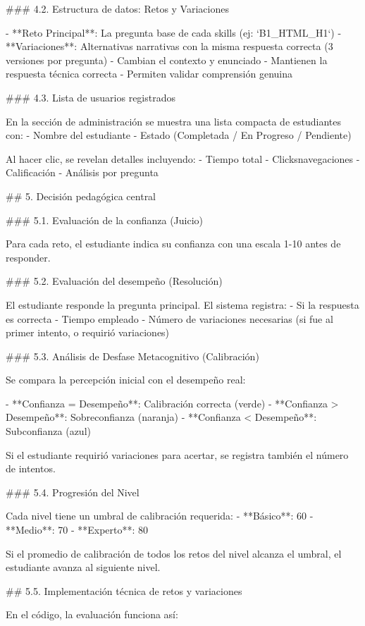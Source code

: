 ### 4.2. Estructura de datos: Retos y Variaciones

- **Reto Principal**: La pregunta base de cada skills (ej: `B1_HTML_H1`)
- **Variaciones**: Alternativas narrativas con la misma respuesta correcta (3 versiones por pregunta)
  - Cambian el contexto y enunciado
  - Mantienen la respuesta técnica correcta
  - Permiten validar comprensión genuina

### 4.3. Lista de usuarios registrados

En la sección de administración se muestra una lista compacta de estudiantes con:
- Nombre del estudiante
- Estado (Completada / En Progreso / Pendiente)

Al hacer clic, se revelan detalles incluyendo:
- Tiempo total
- Clicksnavegaciones
- Calificación
- Análisis por pregunta

## 5. Decisión pedagógica central

### 5.1. Evaluación de la confianza (Juicio)

Para cada reto, el estudiante indica su confianza con una escala 1-10 antes de responder.

### 5.2. Evaluación del desempeño (Resolución)

El estudiante responde la pregunta principal. El sistema registra:
- Si la respuesta es correcta
- Tiempo empleado
- Número de variaciones necesarias (si fue al primer intento, o requirió variaciones)

### 5.3. Análisis de Desfase Metacognitivo (Calibración)

Se compara la percepción inicial con el desempeño real:

- **Confianza = Desempeño**: Calibración correcta (verde)
- **Confianza > Desempeño**: Sobreconfianza (naranja)
- **Confianza < Desempeño**: Subconfianza (azul)

Si el estudiante requirió variaciones para acertar, se registra también el número de intentos.

### 5.4. Progresión del Nivel

Cada nivel tiene un umbral de calibración requerida:
- **Básico**: 60%
- **Medio**: 70%
- **Experto**: 80%

Si el promedio de calibración de todos los retos del nivel alcanza el umbral, el estudiante avanza al siguiente nivel.

## 5.5. Implementación técnica de retos y variaciones

En el código, la evaluación funciona así:

